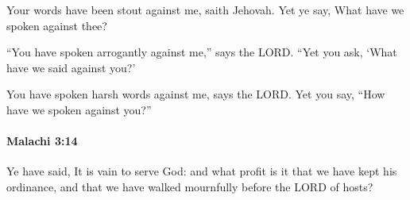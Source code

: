 			\begin{versebox}
					\item[BHS] 
					\item[LXX] 
					\item[ASV] Your words have been stout against me, saith Jehovah. Yet ye say, What have we spoken against thee?
					\item[NIV] “You have spoken arrogantly against me,” says the LORD. “Yet you ask, ‘What have we said against you?’
					\item[NRSV] You have spoken harsh words against me, says the LORD. Yet you say, “How have we spoken against you?”
			\end{versebox}

		\paragraph{Malachi 3:14} %
			\label{MALACHI-3-14}

			Ye have said, It is vain to serve God: and what profit is it that we have kept his ordinance, and that we have walked mournfully before the LORD of hosts?

